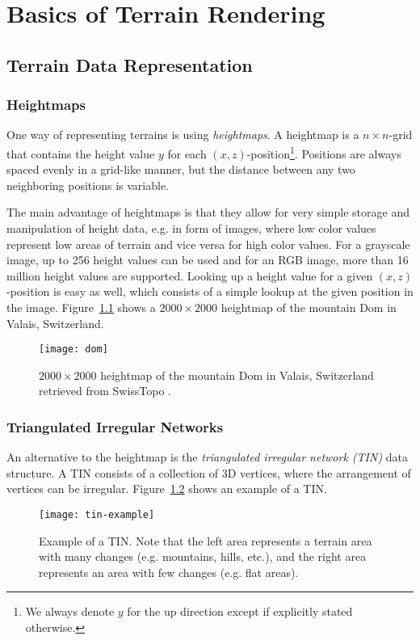\chapter{Basics of Terrain Rendering}
\section{Terrain Data Representation}
\subsection{Heightmaps}
One way of representing terrains is using \textit{heightmaps}.
A heightmap is a $n\times n$-grid that contains 
the height value $y$ for each $(x,z)$-position\footnote{We always denote $y$ for the up direction except if explicitly stated otherwise.}.
Positions are always spaced evenly in a grid-like manner,
but the distance between any two neighboring positions is variable.

The main advantage of heightmaps is that they allow for very simple storage and manipulation of height data, e.g. in form of images,
where low color values represent low areas of terrain and vice versa for
high color values. For a grayscale image, up to 256 height values can be used and for an RGB image,
more than 16 million height values are supported.
Looking up a height value for a given $(x,z)$-position is easy as well,
which consists of a simple lookup at the given position in the image.
Figure~\ref{fig:dom} shows a $2000 \times 2000$ heightmap of the mountain Dom in Valais, Switzerland.
\begin{figure}[H]
  \centering
  \texttt{[image: dom]}
  \caption{$2000 \times 2000$ heightmap of the mountain Dom in Valais, Switzerland retrieved from SwissTopo \cite{alti3d}.}\label{fig:dom}
\end{figure}

\subsection{Triangulated Irregular Networks}
An alternative to the heightmap is the \textit{triangulated irregular network (TIN)} data structure.
A TIN consists of a collection of 3D vertices, where 
the arrangement of vertices can be irregular. Figure~\ref{fig:tin-example} shows 
an example of a TIN.
\begin{figure}[H]
  \centering
  \texttt{[image: tin-example]}
  \caption{Example of a TIN. Note that the left area represents a terrain area with many changes 
  (e.g. mountains, hills, etc.), and the right area represents an area with few changes (e.g. flat areas).}\label{fig:tin-example}
\end{figure}

